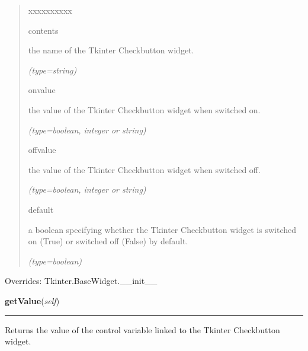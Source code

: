 \begin{boxedminipage}{\funcwidth}
\begin{quote}
\begin{Ventry}{xxxxxxxxxx}
          \item[contents]

          the name of the Tkinter Checkbutton widget.

            {\it (type=string)}

          \item[onvalue]

          the value of the Tkinter Checkbutton widget when switched on.

            {\it (type=boolean, integer or string)}

          \item[offvalue]

          the value of the Tkinter Checkbutton widget when switched off.

            {\it (type=boolean, integer or string)}

          \item[default]

          a boolean specifying whether the Tkinter Checkbutton widget is 
          switched on (True) or switched off (False) by default.

            {\it (type=boolean)}

        \end{Ventry}

      \end{quote}

      Overrides: Tkinter.BaseWidget.\_\_init\_\_

    \end{boxedminipage}

    \label{nMOLDYN:GUI:Widgets:ComboCheckbutton:getValue}

    \vspace{0.5ex}

\hspace{.8\funcindent}\begin{boxedminipage}{\funcwidth}

    \raggedright \textbf{getValue}(\textit{self})

    \vspace{-1.5ex}

    \rule{\textwidth}{0.5\fboxrule}
\setlength{\parskip}{2ex}
    Returns the value of the control variable linked to the Tkinter 
    Checkbutton widget.

\setlength{\parskip}{1ex}
    \end{boxedminipage}

